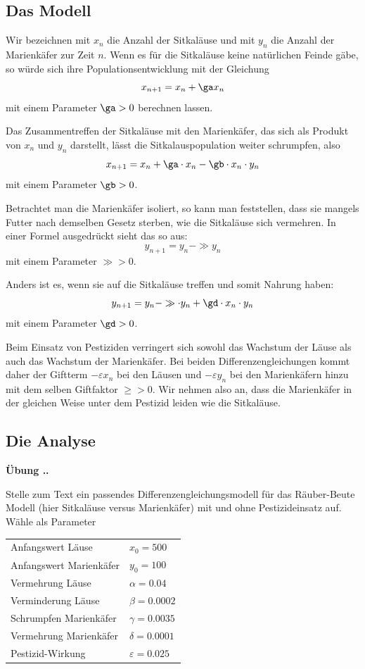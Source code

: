 \documentclass[%
11pt,%
twoside,%
titlepage,%
german,%
headsepline%
]{scrartcl}
\newcommand{\faEyeLightGray}{\textcolor{lightgray}{\faEye}} %
\newcommand{\spaltenheight}{\rule{0mm}{3ex}}
\newcommand{\spaltensep}{\\[1ex]}
\newcommand{\concatueb}[1]{ueb:#1}%
\newcommand{\concatlsg}[1]{lsg:#1}%
\newcounter{uebcounter}[section]
\renewcommand{\theuebcounter}{\thesection.\arabic{uebcounter}}  %
\newenvironment{uebenv}[1]{%
    \refstepcounter{uebcounter}
    \par\noindent\textbf{Übung \theuebcounter.}%
    \label{\concatueb{#1}}\hfill\hyperref[\concatlsg{#1}]{\faEyeLightGray}\par
}{%
    \par
}
\begin{document}
\subsection{Das Modell}
Wir bezeichnen mit $x_n$ die Anzahl der Sitkaläuse und mit $y_n$ die Anzahl der Marienkäfer zur Zeit $n$.
Wenn es für die Sitkaläuse keine natürlichen Feinde gäbe, so würde sich ihre Populationsentwicklung mit der Gleichung
$$x_{n+1}=x_n+\ga x_n$$
mit einem Parameter $\ga > 0$ berechnen lassen.

Das Zusammentreffen der Sitkaläuse mit den Marienkäfer, das sich als Produkt von $x_n$ und $y_n$ darstellt, lässt die Sitkalauspopulation weiter schrumpfen, also
$$x_{n+1}=x_n+\ga\cdot x_n-\gb\cdot x_n\cdot y_n$$
mit einem Parameter $\gb > 0$.

Betrachtet man die Marienkäfer isoliert, so kann man feststellen, dass sie mangels Futter nach demselben Gesetz sterben, wie die Sitkaläuse sich vermehren. In einer Formel ausgedrückt sieht das so aus:
$$y_{n+1}=y_n-\gg y_n$$
mit einem Parameter $\gg > 0$.

Anders ist es, wenn sie auf die Sitkaläuse treffen und somit Nahrung haben:
$$y_{n+1}=y_n-\gg\cdot y_n+\gd\cdot x_n\cdot y_n$$
mit einem Parameter $\gd> 0$.

Beim Einsatz von Pestiziden verringert sich sowohl das Wachstum der Läuse als auch das Wachstum der Marienkäfer. Bei beiden Differenzengleichungen kommt daher der Giftterm $-\varepsilon x_n$ bei den Läusen und $-\varepsilon y_n$ bei den Marienkäfern hinzu mit dem selben Giftfaktor $\ge > 0$. Wir nehmen also an, dass die Marienkäfer in der gleichen Weise unter dem Pestizid leiden wie die Sitkaläuse.

\subsection{Die Analyse}

\begin{uebenv}{weihnachtsbaummodell}
    Stelle zum Text ein passendes Differenzengleichungsmodell für das Räuber-Beute Modell (hier Sitkaläuse versus Marienkäfer) mit und ohne Pestizideinsatz auf. Wähle als Parameter

\begin{center}
\begin{tabular}{ll}
\spaltenheight Anfangswert Läuse & $x_0=500$\spaltensep
\spaltenheight Anfangswert Marienkäfer\hspace*{3ex} & $y_0=100$\spaltensep
\spaltenheight Vermehrung Läuse & $\alpha=0.04$\spaltensep
\spaltenheight Verminderung Läuse & $\beta=0.0002$\spaltensep
\spaltenheight Schrumpfen Marienkäfer & $\gamma=0.0035$\spaltensep
\spaltenheight Vermehrung Marienkäfer & $\delta=0.0001$\spaltensep
\spaltenheight Pestizid-Wirkung & $\varepsilon=0.025$
\end{tabular}
\end{center}
\end{uebenv}
\end{document}
